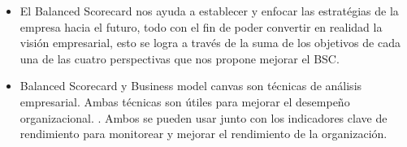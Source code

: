 \documentclass[%
 reprint,
 amsmath,amssymb,
 aps,
]{revtex4-1}
\begin{document}
\begin{itemize}
\item El Balanced Scorecard nos ayuda a establecer y enfocar las estratégias de la empresa hacia el futuro, todo con el fin de poder convertir en realidad la visión empresarial, esto se logra a través de la suma de los objetivos de cada una de las cuatro perspectivas que nos propone mejorar el BSC.

\item Balanced Scorecard y Business model canvas son técnicas de análisis empresarial. Ambas técnicas son útiles para mejorar el desempeño organizacional. . Ambos se pueden usar junto con los indicadores clave de rendimiento para monitorear y mejorar el rendimiento de la organización. 

\end{itemize}


%
%
\end{document}
